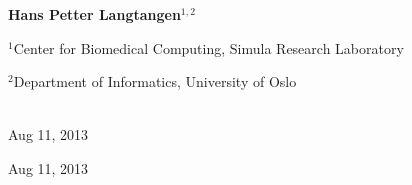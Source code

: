 \documentclass[%
oneside,                 %
final,                   %
10pt]{article}
\begin{document}
\begin{center}
\author{Hans Petter Langtangen}

\begin{center}
{\bf Hans Petter Langtangen${}^{1, 2}$} \\ [0mm]
\end{center}

\begin{center}
\centerline{{\small ${}^1$Center for Biomedical Computing, Simula Research Laboratory}}
\centerline{{\small ${}^2$Department of Informatics, University of Oslo}}
\end{center}


\date{Aug 11, 2013}
\maketitle
\date{Aug 11, 2013
}

\ \\ [10mm]
{\large\textsf{Aug 11, 2013}}

\end{center}
\vfill
\clearpage

\begin{center}
Aug 11, 2013
\end{center}

\vspace{1cm}

\end{document}
